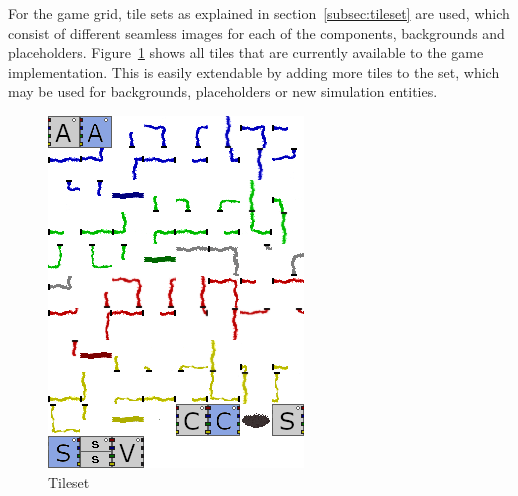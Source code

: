 For the game grid, tile sets as explained in section~\ref{subsec:tileset} are used, which consist of different seamless images for each of the
components, backgrounds and placeholders.
Figure~\ref{fig:tileset} shows all tiles that are currently available to the game implementation.
This is easily extendable by adding more tiles to the set, which may be used for backgrounds, placeholders or new simulation entities.
\begin{figure}
    \centering
    \includegraphics[width=\textwidth]{Pictures/res/implementation/tileset}
    \caption{Tileset}
    \label{fig:tileset}
\end{figure}

